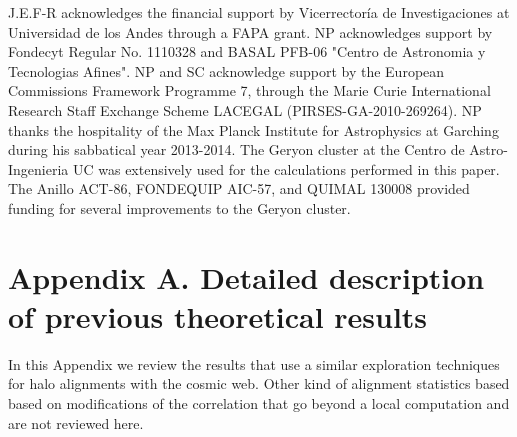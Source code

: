 \documentclass[useAMS,usenatbib]{mn2e}
\begin{document}
J.E.F-R acknowledges the financial support by Vicerrector\'ia de
Investigaciones at Universidad de los Andes through a FAPA grant.
NP acknowledges support by Fondecyt Regular No. 1110328 and BASAL PFB-06 "Centro de Astronomia y Tecnologias Afines".
NP and SC acknowledge support by the European Commissions Framework Programme 7, through the Marie Curie International
Research Staff Exchange Scheme LACEGAL (PIRSES-GA-2010-269264).
NP thanks the hospitality of the Max Planck
Institute for Astrophysics at Garching during his sabbatical year 2013-2014.
The Geryon cluster at the Centro de Astro-Ingenieria UC was extensively used for the calculations performed in this paper.
The Anillo ACT-86, FONDEQUIP AIC-57, and QUIMAL 130008 provided funding for several improvements to the Geryon cluster.

\section*{Appendix A. Detailed description of previous theoretical results}

In this Appendix we review the results that use a similar exploration
techniques for halo alignments with the cosmic web. Other kind of
alignment statistics based based on modifications of the correlation
\citep[e.g.][]{Paz2008,Faltenbacher2009} that go beyond a local computation
and are not reviewed here.
\end{document}
